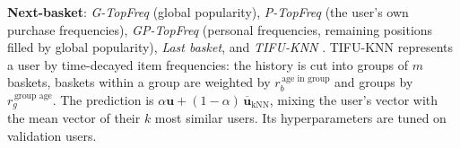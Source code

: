 \textbf{Next-basket}: \emph{G-TopFreq} (global popularity), \emph{P-TopFreq}
(the user's own purchase frequencies), \emph{GP-TopFreq} (personal frequencies,
remaining positions filled by global popularity), \emph{Last basket}, and
\emph{TIFU-KNN} \cite{hu2020}. TIFU-KNN represents a user by time-decayed item
frequencies: the history is cut into groups of $m$ baskets, baskets within a
group are weighted by $r_b^{\,\text{age in group}}$ and groups by
$r_g^{\,\text{group age}}$. The prediction is
$\alpha \mathbf{u} + (1-\alpha)\,\overline{\mathbf{u}}_{\mathrm{kNN}}$, mixing the user's
vector with the mean vector of their $k$ most similar users. Its hyperparameters
are tuned on validation users.
